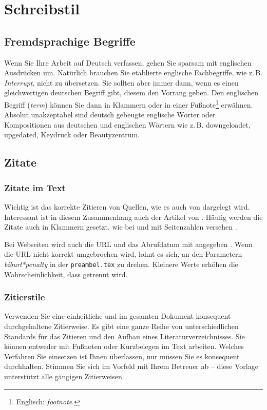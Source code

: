 \chapter{Schreibstil}

\section{Fremdsprachige Begriffe}

Wenn Sie Ihre Arbeit auf Deutsch verfassen, gehen Sie sparsam mit englischen Ausdrücken um. Natürlich brauchen Sie etablierte englische Fachbegriffe, wie z.\,B. \textit{Interrupt}, nicht zu übersetzen. Sie sollten aber immer dann, wenn es einen gleichwertigen deutschen Begriff gibt, diesem den Vorrang geben. Den englischen Begriff (\textit{term}) können Sie dann in Klammern oder in einer Fußnote\footnote{Englisch: \textit{footnote}.} erwähnen. Absolut unakzeptabel sind deutsch gebeugte englische Wörter oder Kompositionen aus deutschen und englischen Wörtern wie z.\,B. downgeloadet, upgedated, Keydruck oder Beautyzentrum.


\section{Zitate}

\subsection{Zitate im Text}

Wichtig ist das korrekte Zitieren von Quellen, wie es auch von \cite{Kornmeier2011} dargelegt wird. Interessant ist in diesem Zusammenhang auch der Artikel von \cite{Kramer2009}. Häufig werden die Zitate auch in Klammern gesetzt, wie bei \parencite{Kornmeier2011} und mit Seitenzahlen versehen \parencite[S. 22--24]{Kornmeier2011}.

Bei Webseiten wird auch die URL und das Abrufdatum mit angegeben \parencite{Gao2017}. Wenn die URL nicht korrekt umgebrochen wird, lohnt es sich, an den Parametern \textit{biburl*penalty} in der \texttt{preambel.tex} zu drehen. Kleinere Werte erhöhen die Wahrscheinlichkeit, dass getrennt wird.

\subsection{Zitierstile}

Verwenden Sie eine einheitliche und im gesamten Dokument konsequent durchgehaltene Zitierweise. Es gibt eine ganze Reihe von unterschiedlichen Standards für das Zitieren und den Aufbau eines Literaturverzeichnisses. Sie können entweder mit Fußnoten oder Kurzbelegen im Text arbeiten. Welches Verfahren Sie einsetzen ist Ihnen überlassen, nur müssen Sie es konsequent durchhalten. Stimmen Sie sich im Vorfeld mit Ihrem Betreuer ab -- diese Vorlage unterstützt alle gängigen Zitierweisen.

